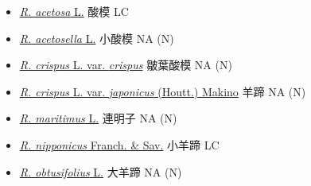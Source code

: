 \begin{itemize}
  \begin{itemize}
        \item[] \href{http://www.theplantlist.org/tpl1.1/search?q=Rumex+acetosa}{\textit{R. acetosa} L.}   酸模   LC
        \item[] \href{http://www.theplantlist.org/tpl1.1/search?q=Rumex+acetosella}{\textit{R. acetosella} L.}   小酸模   NA (N)
        \item[] \href{http://www.theplantlist.org/tpl1.1/search?q=Rumex+crispus+var.+crispus}{\textit{R. crispus} L. var. \textit{crispus}}   皺葉酸模   NA (N)
        \item[] \href{http://www.theplantlist.org/tpl1.1/search?q=Rumex+crispus+var.+japonicus}{\textit{R. crispus} L. var. \textit{japonicus} (Houtt.) Makino}   羊蹄   NA (N)
        \item[] \href{http://www.theplantlist.org/tpl1.1/search?q=Rumex+maritimus}{\textit{R. maritimus} L.}   連明子   NA (N)
        \item[] \href{http://www.theplantlist.org/tpl1.1/search?q=Rumex+nipponicus}{\textit{R. nipponicus} Franch. \& Sav.}   小羊蹄   LC
        \item[] \href{http://www.theplantlist.org/tpl1.1/search?q=Rumex+obtusifolius}{\textit{R. obtusifolius} L.}   大羊蹄   NA (N)
  \end{itemize}
  \end{itemize}

